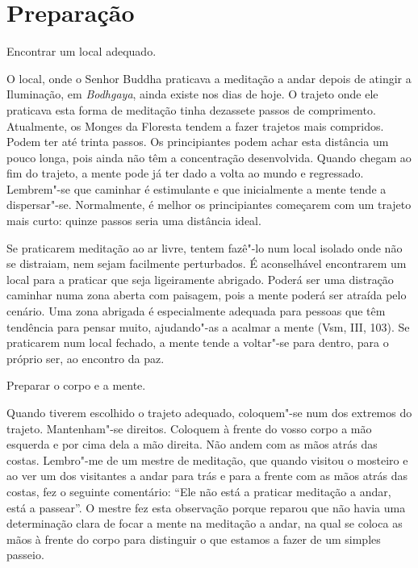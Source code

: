 
\chapter{Preparação}

\begin{siderule-quote}
  Encontrar um local adequado.
\end{siderule-quote}

O local, onde o Senhor Buddha praticava a meditação a andar depois de
atingir a Iluminação, em \emph{Bodhgaya}, ainda existe nos dias de hoje. O
trajeto onde ele praticava esta forma de meditação tinha dezassete passos de
comprimento. Atualmente, os Monges da Floresta tendem a fazer trajetos mais
compridos. Podem ter até trinta passos. Os principiantes podem achar esta
distância um pouco longa, pois ainda não têm a concentração desenvolvida. Quando
chegam ao fim do trajeto, a mente pode já ter dado a volta ao mundo e
regressado. Lembrem"-se que caminhar é estimulante e que inicialmente a mente
tende a dispersar"-se. Normalmente, é melhor os principiantes começarem com um
trajeto mais curto: quinze passos seria uma distância ideal.

Se praticarem meditação ao ar livre, tentem fazê"-lo num local isolado
onde não se distraiam, nem sejam facilmente perturbados. É aconselhável
encontrarem um local para a praticar que seja ligeiramente abrigado.
Poderá ser uma distração caminhar numa zona aberta com paisagem, pois a
mente poderá ser atraída pelo cenário. Uma zona abrigada é especialmente
adequada para pessoas que têm tendência para pensar muito, ajudando"-as a
acalmar a mente (Vsm, III, 103). Se praticarem num local fechado, a
mente tende a voltar"-se para dentro, para o próprio ser, ao encontro da
paz.

\begin{siderule-quote}
  Preparar o corpo e a mente.
\end{siderule-quote}

Quando tiverem escolhido o trajeto adequado, coloquem"-se num dos
extremos do trajeto. Mantenham"-se direitos. Coloquem à frente do vosso
corpo a mão esquerda e por cima dela a mão direita. Não andem com as
mãos atrás das costas. Lembro"-me de um mestre de meditação, que quando
visitou o mosteiro e ao ver um dos visitantes a andar para trás e para a
frente com as mãos atrás das costas, fez o seguinte comentário: ``Ele
não está a praticar meditação a andar, está a passear''. O mestre fez
esta observação porque reparou que não havia uma determinação clara de
focar a mente na meditação a andar, na qual se coloca as mãos à frente
do corpo para distinguir o que estamos a fazer de um simples passeio.

